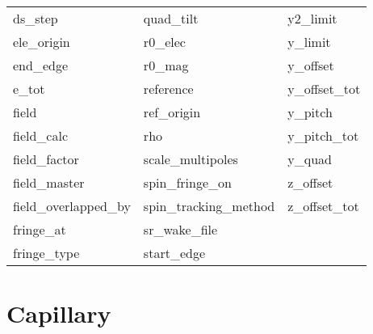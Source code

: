 \begin{tabular}{lll}
ds_step                     & quad_tilt                   & y2_limit                    \\
ele_origin                  & r0_elec                     & y_limit                     \\
end_edge                    & r0_mag                      & y_offset                    \\
e_tot                       & reference                   & y_offset_tot                \\
field                       & ref_origin                  & y_pitch                     \\
field_calc                  & rho                         & y_pitch_tot                 \\
field_factor                & scale_multipoles            & y_quad                      \\
field_master                & spin_fringe_on              & z_offset                    \\
field_overlapped_by         & spin_tracking_method        & z_offset_tot                \\
fringe_at                   & sr_wake_file                &                             \\
fringe_type                 & start_edge                  &                             \\
 \bottomrule
 \end{tabular}
 \vfill
 
 \section{Capillary}
 \label{s:list.capillary}
 
